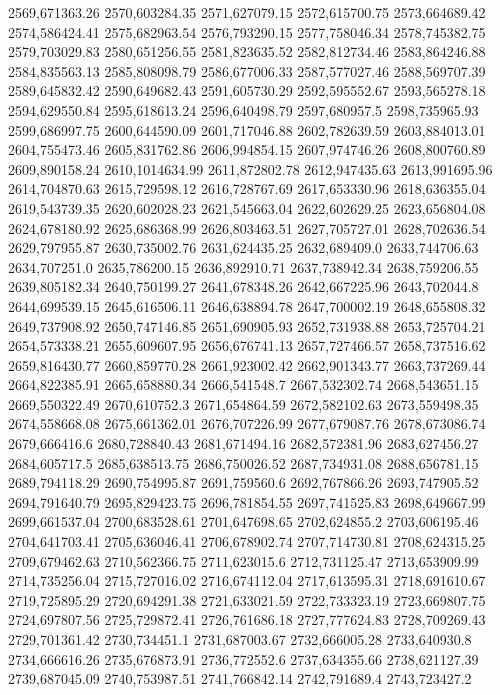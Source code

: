 2569,671363.26
2570,603284.35
2571,627079.15
2572,615700.75
2573,664689.42
2574,586424.41
2575,682963.54
2576,793290.15
2577,758046.34
2578,745382.75
2579,703029.83
2580,651256.55
2581,823635.52
2582,812734.46
2583,864246.88
2584,835563.13
2585,808098.79
2586,677006.33
2587,577027.46
2588,569707.39
2589,645832.42
2590,649682.43
2591,605730.29
2592,595552.67
2593,565278.18
2594,629550.84
2595,618613.24
2596,640498.79
2597,680957.5
2598,735965.93
2599,686997.75
2600,644590.09
2601,717046.88
2602,782639.59
2603,884013.01
2604,755473.46
2605,831762.86
2606,994854.15
2607,974746.26
2608,800760.89
2609,890158.24
2610,1014634.99
2611,872802.78
2612,947435.63
2613,991695.96
2614,704870.63
2615,729598.12
2616,728767.69
2617,653330.96
2618,636355.04
2619,543739.35
2620,602028.23
2621,545663.04
2622,602629.25
2623,656804.08
2624,678180.92
2625,686368.99
2626,803463.51
2627,705727.01
2628,702636.54
2629,797955.87
2630,735002.76
2631,624435.25
2632,689409.0
2633,744706.63
2634,707251.0
2635,786200.15
2636,892910.71
2637,738942.34
2638,759206.55
2639,805182.34
2640,750199.27
2641,678348.26
2642,667225.96
2643,702044.8
2644,699539.15
2645,616506.11
2646,638894.78
2647,700002.19
2648,655808.32
2649,737908.92
2650,747146.85
2651,690905.93
2652,731938.88
2653,725704.21
2654,573338.21
2655,609607.95
2656,676741.13
2657,727466.57
2658,737516.62
2659,816430.77
2660,859770.28
2661,923002.42
2662,901343.77
2663,737269.44
2664,822385.91
2665,658880.34
2666,541548.7
2667,532302.74
2668,543651.15
2669,550322.49
2670,610752.3
2671,654864.59
2672,582102.63
2673,559498.35
2674,558668.08
2675,661362.01
2676,707226.99
2677,679087.76
2678,673086.74
2679,666416.6
2680,728840.43
2681,671494.16
2682,572381.96
2683,627456.27
2684,605717.5
2685,638513.75
2686,750026.52
2687,734931.08
2688,656781.15
2689,794118.29
2690,754995.87
2691,759560.6
2692,767866.26
2693,747905.52
2694,791640.79
2695,829423.75
2696,781854.55
2697,741525.83
2698,649667.99
2699,661537.04
2700,683528.61
2701,647698.65
2702,624855.2
2703,606195.46
2704,641703.41
2705,636046.41
2706,678902.74
2707,714730.81
2708,624315.25
2709,679462.63
2710,562366.75
2711,623015.6
2712,731125.47
2713,653909.99
2714,735256.04
2715,727016.02
2716,674112.04
2717,613595.31
2718,691610.67
2719,725895.29
2720,694291.38
2721,633021.59
2722,733323.19
2723,669807.75
2724,697807.56
2725,729872.41
2726,761686.18
2727,777624.83
2728,709269.43
2729,701361.42
2730,734451.1
2731,687003.67
2732,666005.28
2733,640930.8
2734,666616.26
2735,676873.91
2736,772552.6
2737,634355.66
2738,621127.39
2739,687045.09
2740,753987.51
2741,766842.14
2742,791689.4
2743,723427.2
